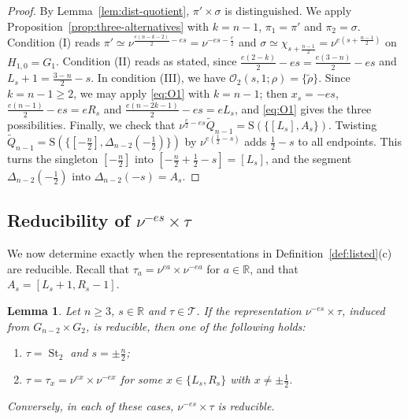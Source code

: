 \documentclass[11pt]{amsart}
\numberwithin{equation}{section}
\theoremstyle{plain}
\newtheorem{lemma}[theorem]{Lemma}
\theoremstyle{definition}
\theoremstyle{remark}
\newcommand{\R}{\mathbb{R}}
\newcommand{\T}{\mathcal{T}}
\DeclareMathOperator{\St}{St}
\newcommand{\Qt}{\widetilde{Q}}
\newcommand{\Ss}{\mathrm{S}}
\begin{document}
\begin{proof}
	By Lemma~\ref{lem:dist-quotient}, $\pi'\times\sigma$ is distinguished. We apply Proposition~\ref{prop:three-alternatives} with $k=n-1$, $\pi_1=\pi'$ and $\pi_2=\sigma$. Condition (I) reads $\pi'\simeq\nu^{\frac{e(n-k-2)}2-es}=\nu^{-es-\frac e2}$ and $\sigma\simeq\chi_{s+\frac{n-1}2}=\nu^{e(s+\frac{n-1}2)}$ on $H_{1,0}=G_1$. Condition (II) reads as stated, since $\frac{e(2-k)}2-es=\frac{e(3-n)}2-es$ and $L_s+1=\frac{3-n}2-s$. In condition (III), we have $\mathcal O_2(s,1;\rho)=\{\widetilde\rho\}$. Since $k=n-1\ge2$, we may apply \eqref{eq:O1} with $k=n-1$; then $x_s=-es$, $\frac{e(n-1)}2-es=eR_s$ and $\frac{e(n-2k-1)}2-es=eL_s$, and \eqref{eq:O1} gives the three possibilities. Finally, we check that $\nu^{\frac e2-es}\Qt_{n-1}=\Ss(\{[L_s],A_s\})$. Twisting $\Qt_{n-1}=\Ss(\{[-\frac n2],\Delta_{n-2}(-\frac12)\})$ by $\nu^{e(\frac12-s)}$ adds $\frac12-s$ to all endpoints. This turns the singleton $[-\frac n2]$ into $[-\frac n2+\frac12-s]=[L_s]$, and the segment $\Delta_{n-2}(-\frac12)$ into $\Delta_{n-2}(-s)=A_s$.
\end{proof}

\subsection{Reducibility of \texorpdfstring{$\nu^{-es}\times\tau$}{nu times tau}}\label{ss:reducibility}

We now determine exactly when the representations in Definition~\ref{def:listed}(c) are reducible. Recall that $\tau_a=\nu^{ea}\times\nu^{-ea}$ for $a\in\R$, and that $A_s=[L_s+1,R_s-1]$.

\begin{lemma}\label{lem:reducible-nu-tau}
	Let $n\ge3$, $s\in\R$ and $\tau\in\T$. If the representation $\nu^{-es}\times\tau$, induced from $G_{n-2}\times G_2$, is reducible, then one of the following holds:
	\begin{enumerate}
		\item $\tau=\St_2$ and $s=\pm\frac n2$;
		\item $\tau=\tau_x=\nu^{ex}\times\nu^{-ex}$ for some $x\in\{L_s,R_s\}$ with $x\ne\pm\frac12$.
	\end{enumerate}
	Conversely, in each of these cases, $\nu^{-es}\times\tau$ is reducible.
\end{lemma}
\end{document}
